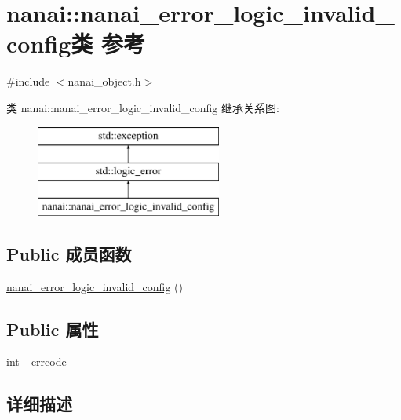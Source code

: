 \hypertarget{classnanai_1_1nanai__error__logic__invalid__config}{}\section{nanai\+:\+:nanai\+\_\+error\+\_\+logic\+\_\+invalid\+\_\+config类 参考}
\label{classnanai_1_1nanai__error__logic__invalid__config}


{\ttfamily \#include $<$nanai\+\_\+object.\+h$>$}

类 nanai\+:\+:nanai\+\_\+error\+\_\+logic\+\_\+invalid\+\_\+config 继承关系图\+:\begin{figure}[H]
\begin{center}
\leavevmode
\includegraphics[height=3.000000cm]{classnanai_1_1nanai__error__logic__invalid__config}
\end{center}
\end{figure}
\subsection*{Public 成员函数}
\begin{DoxyCompactItemize}
\item 
\hyperlink{classnanai_1_1nanai__error__logic__invalid__config_a438680feb6cf552fe30c2227286e2a3b}{nanai\+\_\+error\+\_\+logic\+\_\+invalid\+\_\+config} ()
\end{DoxyCompactItemize}
\subsection*{Public 属性}
\begin{DoxyCompactItemize}
\item 
int \hyperlink{classnanai_1_1nanai__error__logic__invalid__config_aaa8c31731609a42d9d3ba8f0def83aa1}{\+\_\+errcode}
\end{DoxyCompactItemize}


\subsection{详细描述}


